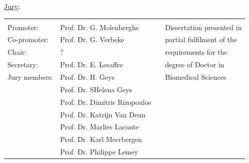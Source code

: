 \begin{titlepage}
{\vspace{1.9cm}
\begin{minipage}{0.4\textwidth}                                                    %
\begin{flushleft}   \small                                                        %
\hspace{0.3cm}\underline{Jury}:
\begin{tabular}{llp{0.5cm}l}
                 \vspace{0.2cm}  & \vspace{0.2cm}  &&\\
                 \hspace{0.1cm} Promoter: & Prof. Dr. G. Molenberghs&& Dissertation presented in  \\
                 \hspace{0.1cm} Co-promoter: & Prof. Dr. G. Verbeke&&  partial fulfilment of the \\
                 \hspace{0.1cm} Chair: & ?&&  requirements for the \\
                 \hspace{0.1cm} Secretary: & Prof. Dr. E. Lesaffre&& degree of Doctor in \\
                 \hspace{0.1cm} Jury members: & Prof. Dr. H. Geys&&  Biomedical Sciences\\
                                                & Prof. Dr. SHelena Geys &&   \\
                                                & Prof. Dr. Dimitris Rizopoulos && \\
                                                &  Prof. Dr. Katrijn Van Deun  && \\
                                                &  Prof. Dr. Marlies Lacante  &&\\
                                                &  Prof. Dr. Karl Meerbergen  &&\\
                                                &  Prof. Dr. Philippe Lemey  &&
               \end{tabular}%
\end{flushleft}                                                                     %
\end{minipage}                                                   %

\vspace{1.3cm}
\begin{center}
\end{center}



}

\end{titlepage}
\clearpage
